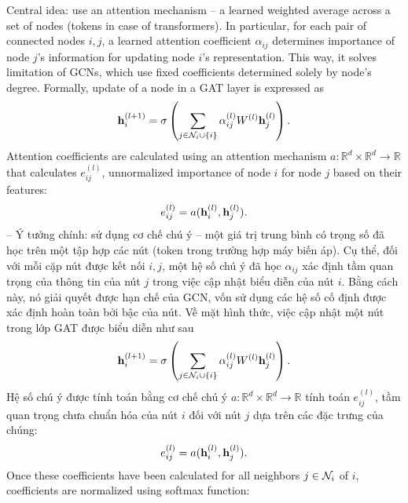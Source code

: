 \documentclass{article}
\begin{document}
\begin{itemize}
\begin{itemize}
\begin{itemize}
            Central idea: use an attention mechanism -- a learned weighted average across a set of nodes (tokens in case of transformers). In particular, for each pair of connected nodes $i,j$, a learned attention coefficient $\alpha_{ij}$ determines importance of node $j$'s information for updating node $i$'s representation. This way, it solves limitation of GCNs, which use fixed coefficients determined solely by node's degree. Formally, update of a node in a GAT layer is expressed as
            \begin{equation*}
                {\bf h}_i^{(l + 1)} = \sigma\left(\sum_{j\in{\cal N}_i\cup\{i\}} \alpha_{ij}^{(l)}W^{(l)}{\bf h}_j^{(l)}\right).
            \end{equation*}
            Attention coefficients are calculated using an attention mechanism $a:\mathbb{R}^d\times\mathbb{R}^d\to\mathbb{R}$ that calculates $e_{ij}^{(l)}$, unnormalized importance of node $i$ for node $j$ based on their features:
            \begin{equation*}
                e_{ij}^{(l)} = a({\bf h}_i^{(l)},{\bf h}_j^{(l)}).
            \end{equation*}
            -- Ý tưởng chính: sử dụng cơ chế chú ý -- một giá trị trung bình có trọng số đã học trên một tập hợp các nút (token trong trường hợp máy biến áp). Cụ thể, đối với mỗi cặp nút được kết nối $i,j$, một hệ số chú ý đã học $\alpha_{ij}$ xác định tầm quan trọng của thông tin của nút $j$ trong việc cập nhật biểu diễn của nút $i$. Bằng cách này, nó giải quyết được hạn chế của GCN, vốn sử dụng các hệ số cố định được xác định hoàn toàn bởi bậc của nút. Về mặt hình thức, việc cập nhật một nút trong lớp GAT được biểu diễn như sau
            \begin{equation*}
                {\bf h}_i^{(l + 1)} = \sigma\left(\sum_{j\in{\cal N}_i\cup\{i\}} \alpha_{ij}^{(l)}W^{(l)}{\bf h}_j^{(l)}\right).
            \end{equation*}
            Hệ số chú ý được tính toán bằng cơ chế chú ý $a:\mathbb{R}^d\times\mathbb{R}^d\to\mathbb{R}$ tính toán $e_{ij}^{(l)}$, tầm quan trọng chưa chuẩn hóa của nút $i$ đối với nút $j$ dựa trên các đặc trưng của chúng:
            \begin{equation*}
                e_{ij}^{(l)} = a({\bf h}_i^{(l)},{\bf h}_j^{(l)}).
            \end{equation*}
            Once these coefficients have been calculated for all neighbors $j\in{\cal N}_i$ of $i$, coefficients are normalized using softmax function:
            \begin{equation*}

\end{equation*}
\end{itemize}
\end{itemize}
\end{itemize}
\end{document}
